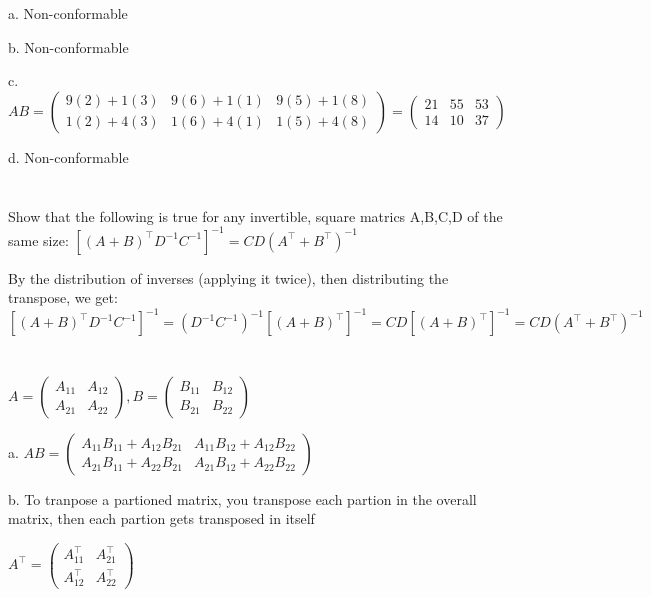 \documentclass{article}
\begin{document}
a. Non-conformable

b. Non-conformable

c. $AB = \begin{pmatrix} 9(2)+1(3) & 9(6)+1(1) & 9(5)+1(8) \\ 1(2)+4(3) & 1(6)+4(1) & 1(5)+4(8) \end{pmatrix} = \begin{pmatrix} 21 & 55 & 53 \\ 14 & 10 & 37 \end{pmatrix}$

d. Non-conformable

\section{}
Show that the following is true for any invertible, square matrics A,B,C,D of the same size: $[(A+B)^{\top}D^{-1}C^{-1}]^{-1} = CD(A^{\top}+B^{\top})^{-1}$

By the distribution of inverses (applying it twice), then distributing the transpose, we get:
$[(A+B)^{\top}D^{-1}C^{-1}]^{-1} = (D^{-1}C^{-1})^{-1}[(A+B)^{\top}]^{-1} = CD[(A+B)^{\top}]^{-1} = CD(A^{\top} + B^{\top})^{-1}$

\section{}
$A = \begin{pmatrix} A_{11} & A_{12} \\ A_{21} & A_{22} \end{pmatrix}, B = \begin{pmatrix} B_{11} & B_{12} \\ B_{21} & B_{22} \end{pmatrix}$

a. $AB = \begin{pmatrix} A_{11}B_{11}+A_{12}B_{21} & A_{11}B_{12}+A_{12}B_{22} \\ A_{21}B_{11}+A_{22}B_{21} & A_{21}B_{12}+A_{22}B_{22} \end{pmatrix}$

b. To tranpose a partioned matrix, you transpose each partion in the overall matrix, then each partion gets transposed in itself

$A^{\top} = \begin{pmatrix} A_{11}^{\top} & A_{21}^{\top} \\ A_{12}^{\top} & A_{22}^{\top} \end{pmatrix}$
\end{document}
